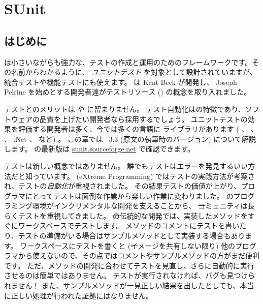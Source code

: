 \documentclass[a4paper,10pt,twoside]{book}
\begin{document}
	\sloppy
\fi
\chapter{SUnit}


\section{はじめに}

 は小さいながらも強力な、テストの作成と運用のためのフレームワークです。その名前からわかるように、 \emph{ユニットテスト} を対象として設計されていますが、統合テストや機能テストにも使えます。 \sunit は Kent Beck が開発し、 Joseph Pelrine を始めとする開発者達がテストリソース () の概念を取り入れました。


テストとのメリットは \pharo や \st に留まりません。
テスト自動化はの特徴であり、ソフトウェアの品質を上げたい開発者なら採用するでしょう。 
ユニットテストの効果を評価する開発者は多く、今では多くの言語に \xUnit ライブラリがあります ( 、  、  、 .Net 、 など) 。
この章では \SUnit~3.3 (原文の執筆時のバージョン) について解説します。
\sunit の最新版は \url{sunit.sourceforge.net} で確認できます。

テストは新しい概念ではありません。
誰でもテストはエラーを発見するいい方法だと知っています。
\mbox{} (eXtreme Programming) ではテストの実践方法が考案され、テストの\emph{自動化}が重視されました。
その結果テストの価値が上がり、プログラマにとってテストは面倒な作業から楽しい作業に変わりました。
\st のプログラミング環境がインクリメンタルな開発を支えることから、 \st コミュニティは長らくテストを重視してきました。
\st の伝統的な開発では、実装したメソッドをすぐにワークスペースでテストします。
メソッドのコメントにテストを書いたり、テストの準備がいる場合はサンプルメソッドとして実装する場合もあります。
ワークスペースにテストを書くと (\st イメージを共有しない限り) 他のプログラマから使えないので、その点ではコメントやサンプルメソッドの方がまだ便利です。
ただ、メソッドの開発に合わせてテストを見直し、さらに自動的に実行させるのは簡単ではありません。
テストが実行されなければ、バグも見つけられません！
また、サンプルメソッドが一見正しい結果を出したとしても、本当に正しい処理が行われた証拠にはなりません。
\end{document}
